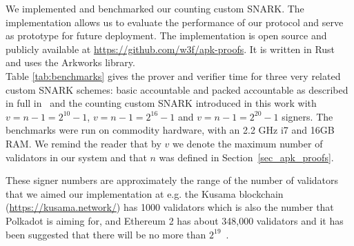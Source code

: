 \noindent We implemented and benchmarked our counting custom SNARK. 
The implementation allows us to evaluate the performance of our protocol 
and serve as prototype for future deployment. The implementation 
is open source and publicly available at \url{https://github.com/w3f/apk-proofs}. 
It is written in Rust and uses the Arkworks library. \\

\noindent Table \ref{tab:benchmarks} gives the prover and verifier time for three very related custom 
SNARK schemes: basic accountable and  packed accountable as described in 
full in~\cite{LC_paper} and the counting custom SNARK introduced in this work 
with $v = n-1 = 2^{10}-1$, $v = n-1 = 2^{16}-1$ and $v=n-1=2^{20}-1$ signers. 
The benchmarks were run on commodity hardware, with an 2.2 GHz i7 and 16GB RAM. 
We remind the reader that by $v$ we denote the maximum number of validators in our 
system and that $n$ was defined in Section~\ref{sec_apk_proofs}.\\


\begin{table*}[h!]
\hfill
\noindent{}
\caption{Proof and verifier times for the different schemes and numbers of signers}
\label{tab:benchmarks}
\end{table*}

\noindent These signer numbers are approximately the range of the number of validators that we aimed our implementation at e.g. the Kusama blockchain (\url{https://kusama.network/}) has 1000 validators which is also the number that Polkadot is aiming for, and Ethereum 2 has about 348,000 validators and it has been suggested that there will be no more than $2^{19}$~\cite{ethresearch1}. \\

